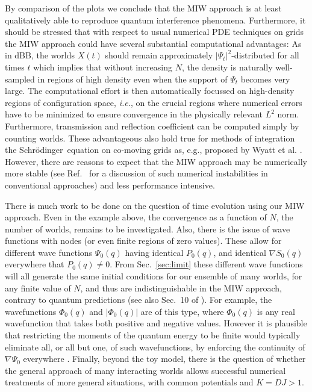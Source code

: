 \documentclass[12pt, aps,pra,amsmath,amssymb,superscriptaddress]{revtex4-2}
\newcommand{\ie}{{\em i.e.}}
\newcommand{\sch}{Schr\"odinger}
\renewcommand{\(}{\left(}
\renewcommand{\)}{\right)}
\newcommand{\blk}{\color{black}}
\newcommand{\blu}{\color{blue}}
\renewcommand\blu{\blk}
\begin{document}
By comparison of the plots we conclude that the MIW approach is at least
qualitatively able \blk to reproduce quantum interference phenomena. Furthermore, it should be
stressed that with respect to usual numerical PDE techniques on grids the MIW
approach
could have several substantial computational advantages: As in dBB,
the worlds ${X}(t)$ should remain approximately $|\Psi_t|^2$-distributed \blk  for all
times $t$ which implies that without increasing $N$, the density is naturally
well-sampled in regions of high density even when the support of
$\Psi_t$ becomes very large. The computational effort is then automatically
focussed on
high-density regions of configuration space, \ie, on the crucial regions where numerical
errors have to be minimized to ensure convergence in the physically relevant $L^2$ norm.
Furthermore, transmission and reflection coefficient can be computed simply by counting
worlds. These advantageous also hold true for methods of integration the \sch\ 
equation on co-moving grids as, e.g., proposed by Wyatt et al. \cite{wyatt}. However,
there are reasons to expect \blk that the MIW approach may be \blk
 numerically more stable (see Ref.~\cite{deckert} for a discussion of such numerical instabilities 
 in conventional approaches) \blk and less performance intensive.
 

 There is much work to be done on the question of time evolution using our 
 MIW approach. Even in the example above, the  convergence 
 as a function of $N$, the number of worlds, remains to be investigated. 
 Also, there is the issue of wave functions 
 with nodes (or even finite regions of zero values). These allow for 
 different wave functions $\Psi_0(q)$ having identical $P_0(q)$, and  identical  $\nabla  S_0(q)$ everywhere that  $P_0(q)\neq 0$.  From  Sec.~\ref{sec:limit}
 these different wave functions will   all generate  the same initial conditions for our 
 ensemble of many worlds,  for any finite value of $N$,   and thus are indistinguishable in the MIW approach,  
 contrary to quantum predictions (see also Sec.~10 of \cite{sebens}). \blu For example,  the wavefunctions $\Phi_0(q)$ and $|\Phi_0(q)|$ are of this type, where  $\Phi_0(q)$ is any real wavefunction that takes both positive and negative values. 
\blk
 However it is plausible that restricting the  moments of the  quantum energy to be finite would  typically  eliminate
 all, or all but one, of such wavefunctions,  by enforcing the continuity of $\nabla \Psi_0$ \blu everywhere \blk \cite{energy1,energy2}.    Finally,  beyond the toy 
 model, there is the question of whether the general approach of many interacting worlds 
allows  successful numerical treatments of  more  general
situations, with common  potentials and $K=DJ>1$. 
\end{document}

